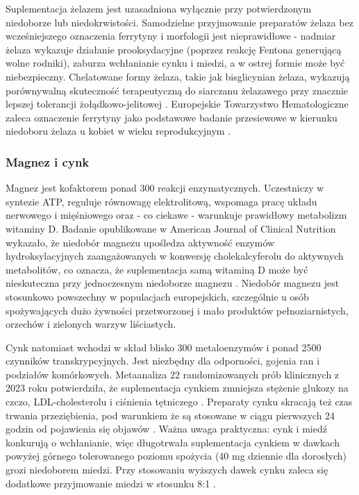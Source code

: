 Suplementacja żelazem jest uzasadniona wyłącznie przy potwierdzonym niedoborze lub niedokrwistości. Samodzielne przyjmowanie preparatów żelaza bez wcześniejszego oznaczenia ferrytyny i morfologii jest nieprawidłowe - nadmiar żelaza wykazuje działanie prooksydacyjne (poprzez reakcję Fentona generującą wolne rodniki), zaburza wchłanianie cynku i miedzi, a w ostrej formie może być niebezpieczny. Chelatowane formy żelaza, takie jak bisglicynian żelaza, wykazują porównywalną skuteczność terapeutyczną do siarczanu żelazawego przy znacznie lepszej tolerancji żołądkowo-jelitowej \cite{iolascon2024recommendations}. Europejskie Towarzystwo Hematologiczne zaleca oznaczenie ferrytyny jako podstawowe badanie przesiewowe w kierunku niedoboru żelaza u kobiet w wieku reprodukcyjnym \cite{iolascon2024recommendations}.


\subsubsection{Magnez i cynk}

Magnez jest kofaktorem ponad 300 reakcji enzymatycznych. Uczestniczy w syntezie ATP, reguluje równowagę elektrolitową, wspomaga pracę układu nerwowego i mięśniowego oraz - co ciekawe - warunkuje prawidłowy metabolizm witaminy D. Badanie opublikowane w American Journal of Clinical Nutrition wykazało, że niedobór magnezu upośledza aktywność enzymów hydroksylacyjnych zaangażowanych w konwersję cholekalcyferolu do aktywnych metabolitów, co oznacza, że suplementacja samą witaminą D może być nieskuteczna przy jednoczesnym niedoborze magnezu \cite{tardy2020vitamins}. Niedobór magnezu jest stosunkowo powszechny w populacjach europejskich, szczególnie u osób spożywających dużo żywności przetworzonej i mało produktów pełnoziarnistych, orzechów i zielonych warzyw liściastych.

Cynk natomiast wchodzi w skład blisko 300 metaloenzymów i ponad 2500 czynników transkrypcyjnych. Jest niezbędny dla odporności, gojenia ran i podziałów komórkowych. Metaanaliza 22 randomizowanych prób klinicznych z 2023 roku potwierdziła, że suplementacja cynkiem zmniejsza stężenie glukozy na czczo, LDL-cholesterolu i ciśnienia tętniczego \cite{tardy2020vitamins}. Preparaty cynku skracają też czas trwania przeziębienia, pod warunkiem że są stosowane w ciągu pierwszych 24 godzin od pojawienia się objawów \cite{hemila1996vitamin}. Ważna uwaga praktyczna: cynk i miedź konkurują o wchłanianie, więc długotrwała suplementacja cynkiem w dawkach powyżej górnego tolerowanego poziomu spożycia (40 mg dziennie dla dorosłych) grozi niedoborem miedzi. Przy stosowaniu wyższych dawek cynku zaleca się dodatkowe przyjmowanie miedzi w stosunku 8:1 \cite{tardy2020vitamins}.


